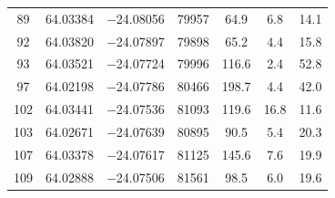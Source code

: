 \documentclass{aa}
\begin{document}
\begin{appendix}
\begin{longtable}{c c c c c c c}
89 & 64.03384 & $-$24.08056 & 79957 & 64.9 & 6.8 & 14.1 \\
92 & 64.03820 & $-$24.07897 & 79898 & 65.2 & 4.4 & 15.8 \\
93 & 64.03521 & $-$24.07724 & 79996 & 116.6 & 2.4 & 52.8 \\
97 & 64.02198 & $-$24.07786 & 80466 & 198.7 & 4.4 & 42.0 \\
102 & 64.03441 & $-$24.07536 & 81093 & 119.6 & 16.8 & 11.6 \\
103 & 64.02671 & $-$24.07639 & 80895 & 90.5 & 5.4 & 20.3 \\
107 & 64.03378 & $-$24.07617 & 81125 & 145.6 & 7.6 & 19.9 \\
109 & 64.02888 & $-$24.07506 & 81561 & 98.5 & 6.0 & 19.6 \\

\end{longtable}


\end{appendix}
\end{document}
